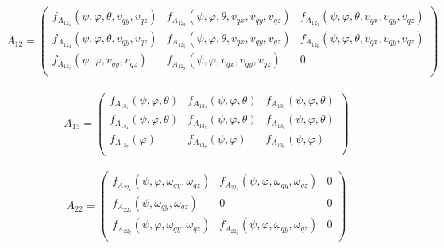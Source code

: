 \documentclass[main]{subfiles}
\begin{document}
\begin{equation}
A_{12}=\left(\begin{array}{ccc}
f_{A_{12_1}}(\psi,\varphi,\theta,v_{qy},v_{qz}) & f_{A_{12_2}}(\psi,\varphi,\theta,v_{qx},v_{qy},v_{qz}) &  f_{A_{12_3}}(\psi,\varphi,\theta,v_{qx},v_{qy},v_{qz}) \\
f_{A_{12_4}}(\psi,\varphi,\theta,v_{qy},v_{qz}) & f_{A_{12_5}}(\psi,\varphi,\theta,v_{qx},v_{qy},v_{qz}) & f_{A_{12_6}}(\psi,\varphi,\theta,v_{qx},v_{qy},v_{qz}) \\
f_{A_{12_7}}(\psi,\varphi,v_{qy},v_{qz})&                                                        f_{A_{12_8}}(\psi,\varphi,v_{qx},v_{qy},v_{qz})&                                                                                                                                                 0\\
\end{array}\right)
\end{equation}\\

\begin{equation}
A_{13}=\left(\begin{array}{ccc}
f_{A_{13_1}}(\psi,\varphi,\theta) & f_{A_{13_2}}(\psi,\varphi,\theta) &  f_{A_{13_3}}(\psi,\varphi,\theta) \\
f_{A_{13_4}}(\psi,\varphi,\theta) & f_{A_{13_5}}(\psi,\varphi,\theta) & f_{A_{13_6}}(\psi,\varphi,\theta) \\
f_{A_{13_7}}(\varphi)& f_{A_{13_8}}(\psi,\varphi)&                                                                                                                                                 f_{A_{13_8}}(\psi,\varphi)\\
\end{array}\right)
\end{equation}\\

\begin{equation}
A_{22}=\left(\begin{array}{ccc}
f_{A_{22_1}}(\psi,\varphi,\omega_{qy},\omega_{qz}) & f_{A_{22_2}}(\psi,\varphi,\omega_{qy},\omega_{qz}) &  0 \\
f_{A_{22_4}}(\psi,\omega_{qy},\omega_{qz}) & 0 & 0 \\
f_{A_{22_7}}(\psi,\varphi,\omega_{qy},\omega_{qz})&                                                        f_{A_{22_8}}(\psi,\varphi,\omega_{qy},\omega_{qz})&                                                                                                                                                 0\\
\end{array}\right)
\end{equation}\\
\end{document}
